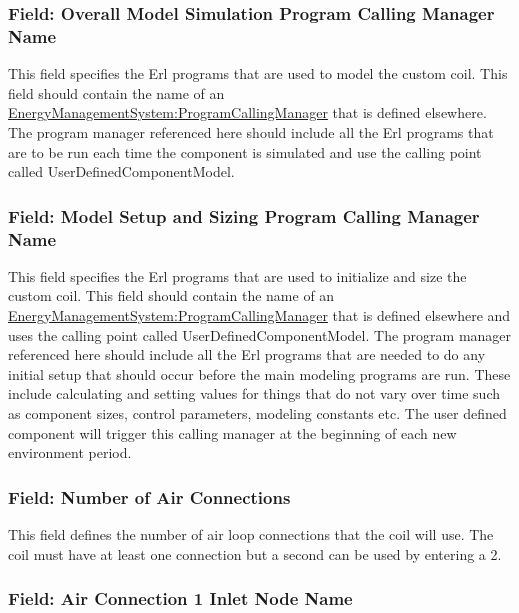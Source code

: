 \subsubsection{Field: Overall Model Simulation Program Calling Manager Name}\label{field-overall-model-simulation-program-calling-manager-name-2}

This field specifies the Erl programs that are used to model the custom coil. This field should contain the name of an \hyperref[energymanagementsystemprogramcallingmanager]{EnergyManagementSystem:ProgramCallingManager} that is defined elsewhere. The program manager referenced here should include all the Erl programs that are to be run each time the component is simulated and use the calling point called UserDefinedComponentModel.

\subsubsection{Field: Model Setup and Sizing Program Calling Manager Name}\label{field-model-setup-and-sizing-program-calling-manager-name-2}

This field specifies the Erl programs that are used to initialize and size the custom coil. This field should contain the name of an \hyperref[energymanagementsystemprogramcallingmanager]{EnergyManagementSystem:ProgramCallingManager} that is defined elsewhere and uses the calling point called UserDefinedComponentModel. The program manager referenced here should include all the Erl programs that are needed to do any initial setup that should occur before the main modeling programs are run. These include calculating and setting values for things that do not vary over time such as component sizes, control parameters, modeling constants etc. The user defined component will trigger this calling manager at the beginning of each new environment period.

\subsubsection{Field: Number of Air Connections}\label{field-number-of-air-connections}

This field defines the number of air loop connections that the coil will use. The coil must have at least one connection but a second can be used by entering a 2.

\subsubsection{Field: Air Connection 1 Inlet Node Name}\label{field-air-connection-1-inlet-node-name}

